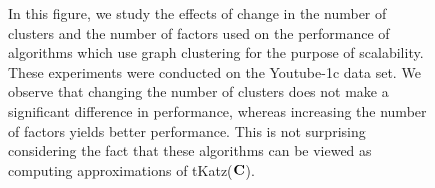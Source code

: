 \begin{figure}[ht]
  \begin{center}
  \end{center}
  \caption{In this figure, we study the effects of change in the number of clusters and the number of factors used on the performance of algorithms which use graph clustering for the purpose of scalability. These experiments were conducted on the Youtube-1c data set. We observe that changing the number of clusters does not make a significant difference in performance, whereas increasing the number of factors yields better performance. This is not surprising considering the fact that these algorithms can be viewed as computing approximations of \textsf{tKatz}($\mathbf{C}$).}
  \label{fig:summaryDependency}
\end{figure}



